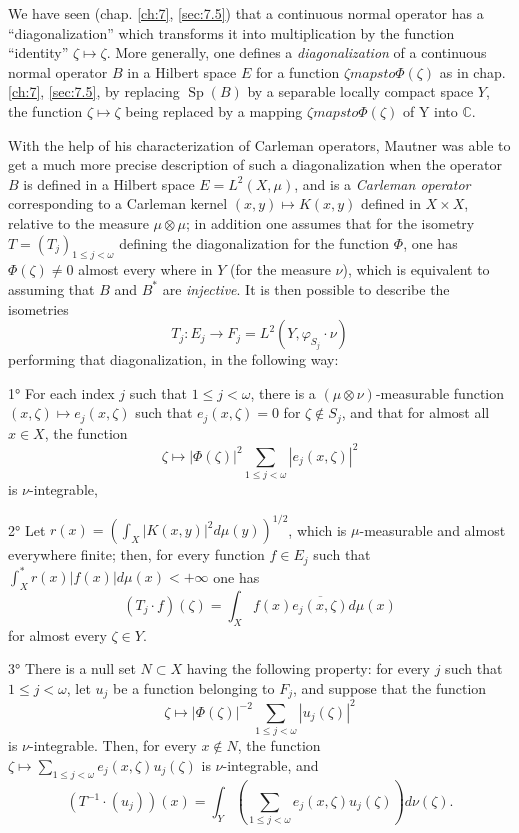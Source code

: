 \documentclass[12pt,a4paper,leqno,twoside]{extbook}
\newcommand{\C}{\mathbb{C}}
\newcommand{\spec}{\operatorname{Sp}}
\begin{document}
We have seen (chap. \ref{ch:7}, \ref{sec:7.5}) that a continuous normal operator has a ``diagonalization'' which transforms it into multiplication by the function ``identity'' \(\zeta \mapsto \zeta\). More generally, one defines a \emph{diagonalization} of a continuous normal operator \(B\) in a Hilbert space \(E\) for a function \(\zeta mapsto \Phi(\zeta)\) as in chap. \ref{ch:7}, \ref{sec:7.5}, by replacing \(\spec(B)\) by a separable locally compact space \(Y\), the function \(\zeta \mapsto \zeta\) being replaced by a mapping \(\zeta mapsto \Phi(\zeta)\) of Y into \(\C\).

With the help of his characterization of Carleman operators, Mautner was able to get a much more precise description of such a diagonalization when the operator \(B\) is defined in a Hilbert space \(E = L^2(X,\mu)\), and is a \emph{Carleman operator} corresponding to a Carleman kernel \((x,y) \mapsto K(x,y)\) defined in \(X \times X\), relative to the measure \(\mu \otimes \mu\); in addition one assumes that for the isometry \(T = (T_j)_{1 \leq j < \omega}\) defining the diagonalization for the function \(\Phi\), one has \(\Phi(\zeta) \neq 0\) almost every where in \(Y\) (for the measure \(\nu\)), which is equivalent to assuming that \(B\) and \(B^*\) are \emph{injective}. It is then possible to describe the isometries
\[
    T_j: E_j \to F_j = L^2(Y, \varphi_{S_j} \cdot \nu)
\]
performing that diagonalization, in the following way:

1° For each index \(j\) such that \(1 \leq j < \omega\), there is a \((\mu \otimes \nu)\)-measurable function \((x, \zeta) \mapsto e_j(x, \zeta)\) such that \(e_j(x, \zeta) = 0\) for \(\zeta \not\in S_j\), and that for almost all \(x \in X\), the function
\[
    \zeta \mapsto |\Phi(\zeta)|^2 \sum_{1 \leq j < \omega} |e_j(x, \zeta)|^2
\]
is \(\nu\)-integrable,

2° Let \(r(x) = \left( \int_X |K(x,y)|^2 d\mu(y) \right)^{1/2}\), which is \(\mu\)-measurable and almost everywhere finite; then, for every function \(f \in E_j\) such that \(\int_X^* r(x)|f(x)|d\mu(x) < +\infty\) one has
\begin{equation}
    \label{eq:9.10}
    (T_j \cdot f)(\zeta) = \int_X f(x)\overline{e_j(x, \zeta)} d\mu(x)
\end{equation}
for almost every \(\zeta \in Y\).

3° There is a null set \(N \subset X\) having the following property: for every \(j\) such that \(1 \leq j < \omega\), let \(u_j\) be a function belonging to \(F_j\), and suppose that the function
\[
    \zeta \mapsto |\Phi(\zeta)|^{-2} \sum_{1 \leq j < \omega} |u_j(\zeta)|^2
\]
is \(\nu\)-integrable. Then, for every \(x \not\in N\), the function \(\zeta \mapsto \sum_{1 \leq j < \omega} e_j(x, \zeta) u_j(\zeta)\) is \(\nu\)-integrable, and
\begin{equation}
    \label{eq:9.11}
    (T^{-1} \cdot (u_j))(x) = \int_Y \left( \sum_{1 \leq j < \omega} e_j(x, \zeta) u_j(\zeta) \right) d\nu(\zeta).
\end{equation}
\end{document}
